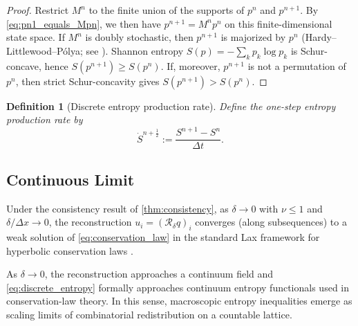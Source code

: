\documentclass[sn-basic]{sn-jnl}
\theoremstyle{plain}
\newtheorem{definition}[theorem]{Definition}
\theoremstyle{remark}
\begin{document}
\begin{proof}
Restrict $M^n$ to the finite union of the supports of $p^n$ and $p^{n+1}$.
By \cref{eq:pn1_equals_Mpn}, we then have $p^{n+1}=M^n p^n$ on this finite-dimensional state space.
If $M^n$ is doubly stochastic, then $p^{n+1}$ is majorized by $p^n$ (Hardy--Littlewood--P\'olya; see \cite{marshallInequalitiesTheoryMajorization2011}).
Shannon entropy $S(p)=-\sum_k p_k\log p_k$ is Schur-concave, hence $S(p^{n+1})\ge S(p^n)$.
If, moreover, $p^{n+1}$ is not a permutation of $p^n$, then strict Schur-concavity gives $S(p^{n+1})>S(p^n)$.
\end{proof}

\begin{definition}[Discrete entropy production rate]
\label{def:entropy_rate}
Define the one-step entropy production rate by
\begin{equation}
\dot S^{n+\frac12} := \frac{S^{n+1}-S^n}{\Delta t}.
\label{eq:entropy_rate}
\end{equation}
\end{definition}

\subsection*{Continuous Limit}
\label{subsec:continuous_limit}

Under the consistency result of \cref{thm:consistency}, as $\delta \to 0$ with $\nu \le 1$ and $\delta/\Delta x \to 0$, the reconstruction $u_i = (\mathcal R_\delta q)_i$ converges (along subsequences) to a weak solution of \cref{eq:conservation_law} in the standard Lax framework for hyperbolic conservation laws \cite{evansPartialDifferentialEquations2010,toroRiemannSolversNumerical2009}.

As $\delta \to 0$, the reconstruction approaches a continuum field and \cref{eq:discrete_entropy} formally approaches continuum entropy functionals used in conservation-law theory. In this sense, macroscopic entropy inequalities emerge as scaling limits of combinatorial redistribution on a countable lattice.
\end{document}

